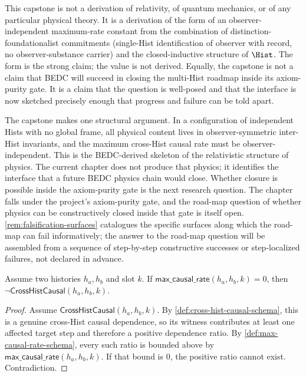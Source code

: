 \begin{remark}
\label{rem:what-this-is-not}
This capstone is not a derivation of relativity, of quantum mechanics, or of any particular physical theory. It is a derivation of the form of an observer-independent maximum-rate constant from the combination of distinction-foundationalist commitments (single-Hist identification of observer with record, no observer-substance carrier) and the closed-inductive structure of \(\Hist\). The form is the strong claim; the value is not derived. Equally, the capstone is not a claim that BEDC will succeed in closing the multi-Hist roadmap inside its axiom-purity gate. It is a claim that the question is well-posed and that the interface is now sketched precisely enough that progress and failure can be told apart.
\end{remark}

\begin{remark}
\label{rem:closing-physics-from-locality}
The capstone makes one structural argument. In a configuration of independent Hists with no global frame, all physical content lives in observer-symmetric inter-Hist invariants, and the maximum cross-Hist causal rate must be observer-independent. This is the BEDC-derived skeleton of the relativistic structure of physics. The current chapter does not produce that physics; it identifies the interface that a future BEDC physics chain would close. Whether closure is possible inside the axiom-purity gate is the next research question. The chapter falls under the project's axiom-purity gate, and the road-map question of whether physics can be constructively closed inside that gate is itself open. \autoref{rem:falsification-surfaces} catalogues the specific surfaces along which the road-map can fail informatively; the answer to the road-map question will be assembled from a sequence of step-by-step constructive successes or step-localized failures, not declared in advance.
\end{remark}

\begin{lemma}
\label{lem:zero-max-rate-forbids-causal-dependence}
Assume two histories $h_a, h_b$ and slot $k$. If
$\mathsf{max\_causal\_rate}(h_a,h_b,k)=0$, then $\neg\textsf{CrossHistCausal}(h_a,h_b,k)$.
\begin{proof}
Assume $\textsf{CrossHistCausal}(h_a,h_b,k)$. By 
\autoref{def:cross-hist-causal-schema}, this is a genuine cross-Hist causal dependence, so its witness contributes at least one affected target step and therefore a positive dependence ratio.
By 
\autoref{def:max-causal-rate-schema}, every such ratio is bounded above by
$\mathsf{max\_causal\_rate}(h_a,h_b,k)$. If that bound is $0$, the positive ratio cannot exist. Contradiction.
\end{proof}
\end{lemma}
